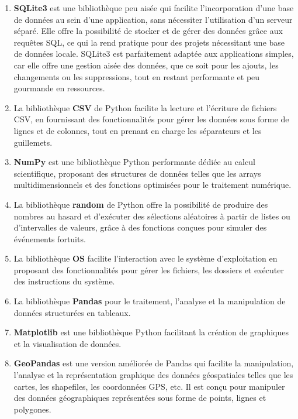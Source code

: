 \documentclass[
]{article}
\begin{document}
\begin{enumerate}
\def\labelenumi{\arabic{enumi}.}
\item
  \textbf{SQLite3} est une bibliothèque peu aisée qui facilite
  l'incorporation d'une base de données au sein d'une application, sans
  nécessiter l'utilisation d'un serveur séparé. Elle offre la
  possibilité de stocker et de gérer des données grâce aux requêtes SQL,
  ce qui la rend pratique pour des projets nécessitant une base de
  données locale. SQLite3 est parfaitement adaptée aux applications
  simples, car elle offre une gestion aisée des données, que ce soit
  pour les ajouts, les changements ou les suppressions, tout en restant
  performante et peu gourmande en ressources.
\item
  La bibliothèque \textbf{CSV} de Python facilite la lecture et
  l'écriture de fichiers CSV, en fournissant des fonctionnalités pour
  gérer les données sous forme de lignes et de colonnes, tout en prenant
  en charge les séparateurs et les guillemets.
\item
  \textbf{NumPy} est une bibliothèque Python performante dédiée au
  calcul scientifique, proposant des structures de données telles que
  les arrays multidimensionnels et des fonctions optimisées pour le
  traitement numérique.
\item
  La bibliothèque \textbf{random} de Python offre la possibilité de
  produire des nombres au hasard et d'exécuter des sélections aléatoires
  à partir de listes ou d'intervalles de valeurs, grâce à des fonctions
  conçues pour simuler des événements fortuits.
\item
  La bibliothèque \textbf{OS} facilite l'interaction avec le système
  d'exploitation en proposant des fonctionnalités pour gérer les
  fichiers, les dossiers et exécuter des instructions du système.
\item
  La bibliothèque \textbf{Pandas} pour le traitement, l'analyse et la
  manipulation de données structurées en tableaux.
\item
  \textbf{Matplotlib} est une bibliothèque Python facilitant la création
  de graphiques et la visualisation de données.
\item
  \textbf{GeoPandas} est une version améliorée de Pandas qui facilite la
  manipulation, l'analyse et la représentation graphique des données
  géospatiales telles que les cartes, les shapefiles, les coordonnées
  GPS, etc. Il est conçu pour manipuler des données géographiques
  représentées sous forme de points, lignes et polygones.
\end{enumerate}
\end{document}
